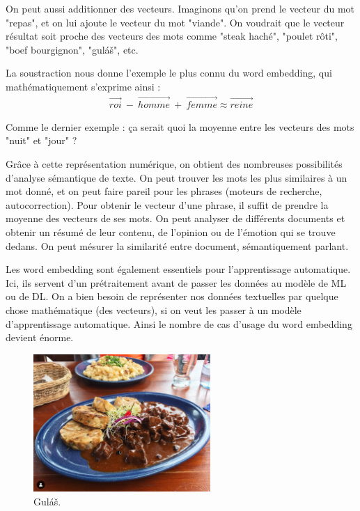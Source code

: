 \documentclass[11pt, a4paper]{report}
\begin{document}
On peut aussi additionner des vecteurs. Imaginons qu'on prend le vecteur du mot "repas", et on lui 
ajoute le vecteur du mot "viande". On voudrait que le vecteur résultat soit proche des vecteurs 
des mots comme "steak haché", "poulet rôti", "boef bourgignon", "guláš", etc. 

La soustraction nous donne l'exemple le plus connu du word embedding, qui mathématiquement 
s'exprime ainsi : 
\begin{align*}
  \overrightarrow{roi} \ - \ \overrightarrow{homme} \ + \ \overrightarrow{femme} \approx \overrightarrow{reine}
\end{align*}

Comme le dernier exemple : ça serait quoi la moyenne entre les vecteurs des mots "nuit" et "jour" ?


Grâce à cette représentation numérique, on obtient des nombreuses 
possibilités d'analyse sémantique de texte. On peut trouver les mots les plus similaires à un mot donné, 
et on peut faire pareil pour les phrases (moteurs de recherche, autocorrection). Pour obtenir 
le vecteur d'une phrase, il suffit de prendre la moyenne des vecteurs de ses mots.  
On peut analyser de différents documents et obtenir un résumé de leur contenu, de l'opinion 
ou de l'émotion qui se trouve dedans. On peut mésurer la similarité entre document, sémantiquement
parlant. 

Les word embedding sont également essentiels pour l'apprentissage automatique. 
Ici, ils servent d'un prétraitement avant de passer les données au modèle de ML ou de DL. 
On a bien besoin de représenter nos données textuelles par quelque chose mathématique (des vecteurs), 
si on veut les passer à un modèle d'apprentissage automatique. Ainsi le nombre de cas d'usage 
du word embedding devient énorme. 

\begin{figure}[h]
  \centering
  \includegraphics[width=0.6\textwidth]{gulas.png}
  \caption{Guláš.}
  \label{fig:gulas}
\end{figure}
\end{document}
